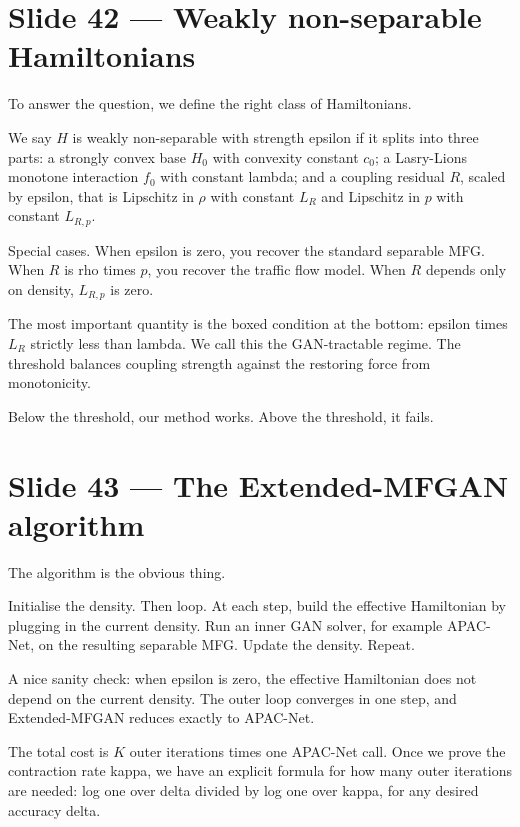 \documentclass[11pt]{article}
\begin{document}
\section*{Slide 42 --- Weakly non-separable Hamiltonians}

To answer the question, we define the right class of Hamiltonians.

We say $H$ is weakly non-separable with strength epsilon if it splits into
three parts: a strongly convex base $H_0$ with convexity constant $c_0$;
a Lasry-Lions monotone interaction $f_0$ with constant lambda; and a
coupling residual $R$, scaled by epsilon, that is Lipschitz in $\rho$ with
constant $L_R$ and Lipschitz in $p$ with constant $L_{R,p}$.

Special cases. When epsilon is zero, you recover the standard separable
MFG. When $R$ is rho times $p$, you recover the traffic flow model. When
$R$ depends only on density, $L_{R,p}$ is zero.

The most important quantity is the boxed condition at the bottom: epsilon
times $L_R$ strictly less than lambda. We call this the GAN-tractable
regime. The threshold balances coupling strength against the restoring
force from monotonicity.

Below the threshold, our method works. Above the threshold, it fails.

\section*{Slide 43 --- The Extended-MFGAN algorithm}

The algorithm is the obvious thing.

Initialise the density. Then loop. At each step, build the effective
Hamiltonian by plugging in the current density. Run an inner GAN solver, for
example APAC-Net, on the resulting separable MFG. Update the density.
Repeat.

A nice sanity check: when epsilon is zero, the effective Hamiltonian does
not depend on the current density. The outer loop converges in one step,
and Extended-MFGAN reduces exactly to APAC-Net.

The total cost is $K$ outer iterations times one APAC-Net call. Once we
prove the contraction rate kappa, we have an explicit formula for how
many outer iterations are needed: log one over delta divided by log one
over kappa, for any desired accuracy delta.

\end{document}
